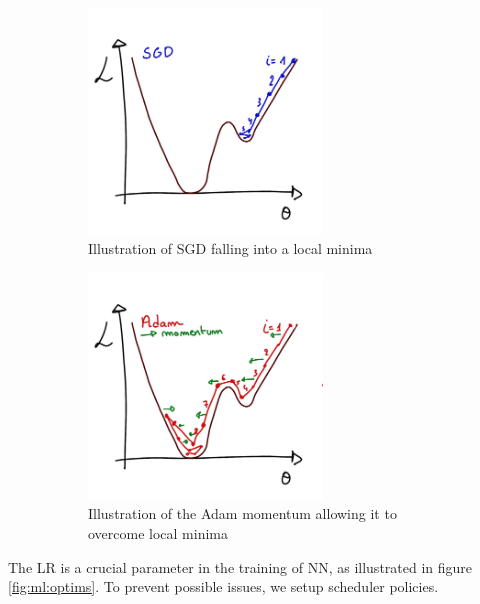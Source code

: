 \documentclass[../main.tex]{subfiles}
\begin{document}
\begin{figure}
  \centering
  \begin{subfigure}[t]{0.48\linewidth}
    \includegraphics[height=6cm]{images/ml/sgd.jpg}
    \caption{Illustration of SGD falling into a local minima}
    \label{fig:ml:sgd}
  \end{subfigure}
  \hfill
  \begin{subfigure}[t]{0.48\linewidth}
    \includegraphics[height=6cm]{images/ml/Adam.jpg}
    \caption{Illustration of the Adam momentum allowing it to overcome local minima}
    \label{fig:ml:adam}
  \end{subfigure}
  \caption{}
\end{figure}

The LR is a crucial parameter in the training of NN, as illustrated in figure \ref{fig:ml:optims}. To prevent possible issues, we setup scheduler policies.
\end{document}

